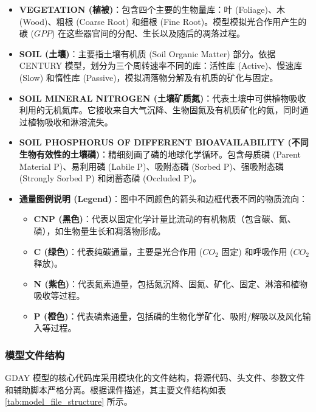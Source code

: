 \documentclass[10pt]{config}
\begin{document}
\begin{itemize}
    \item \textbf{VEGETATION (植被)}：包含四个主要的生物量库：叶 (Foliage)、木 (Wood)、粗根 (Coarse Root) 和细根 (Fine Root)。模型模拟光合作用产生的碳 ($GPP$) 在这些器官间的分配、生长以及随后的凋落过程。
    
    \item \textbf{SOIL (土壤)}：主要指土壤有机质 (Soil Organic Matter) 部分。依据 CENTURY 模型，划分为三个周转速率不同的库：活性库 (Active)、慢速库 (Slow) 和惰性库 (Passive)，模拟凋落物分解及有机质的矿化与固定。
    
    \item \textbf{SOIL MINERAL NITROGEN (土壤矿质氮)}：代表土壤中可供植物吸收利用的无机氮库。它接收来自大气沉降、生物固氮及有机质矿化的氮，同时通过植物吸收和淋溶流失。
    
    \item \textbf{SOIL PHOSPHORUS OF DIFFERENT BIOAVAILABILITY (不同生物有效性的土壤磷)}：精细刻画了磷的地球化学循环。包含母质磷 (Parent Material P)、易利用磷 (Labile P)、吸附态磷 (Sorbed P)、强吸附态磷 (Strongly Sorbed P) 和闭蓄态磷 (Occluded P)。
    
    \item \textbf{通量图例说明 (Legend)}：图中不同颜色的箭头和边框代表不同的物质流向：
    \begin{itemize}
        \item \textbf{CNP (黑色)}：代表以固定化学计量比流动的有机物质（包含碳、氮、磷），如生物量生长和凋落物形成。
        \item \textbf{C (绿色)}：代表纯碳通量，主要是光合作用 ($CO_2$ 固定) 和呼吸作用 ($CO_2$ 释放)。
        \item \textbf{N (紫色)}：代表氮素通量，包括氮沉降、固氮、矿化、固定、淋溶和植物吸收等过程。
        \item \textbf{P (橙色)}：代表磷素通量，包括磷的生物化学矿化、吸附/解吸以及风化输入等过程。
    \end{itemize}
\end{itemize}

\subsubsection{模型文件结构}
GDAY 模型的核心代码库采用模块化的文件结构，将源代码、头文件、参数文件和辅助脚本严格分离。根据课件描述，其主要文件结构如表 \ref{tab:model_file_structure} 所示。
\end{document}

